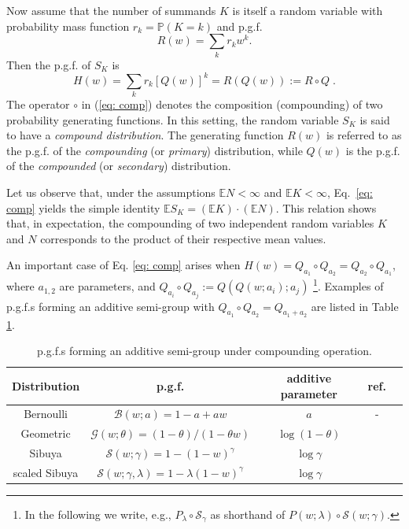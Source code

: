 \documentclass[a4paper,12pt]{amsart}
\newcommand{\E}{\mathbb{E}}
\theoremstyle{definition}
\theoremstyle{remark}
\begin{document}
Now assume that the number of summands \(K\) is itself a random variable with probability mass function \(r_k = \mathbb{P}(K = k)\) and p.g.f.
\[
R(w) = \sum_{k} r_k w^k.
\]
Then the p.g.f. of \(S_K\) is
\begin{equation}
\label{eq: comp}
H(w) = \sum_{k} r_k [Q(w)]^k = R(Q(w)) := R \circ Q \;.
\end{equation}
The operator \(\circ\) in (\ref{eq: comp}) denotes the composition (compounding) of two probability generating functions. In this setting, the random variable \(S_K\) is said to have a {\it compound distribution}. The generating function \(R(w)\) is referred to as the p.g.f. of the {\it compounding} (or {\it primary}) distribution, while \(Q(w)\) is the p.g.f. of the {\it compounded} (or {\it secondary}) distribution.

Let us observe that, under the assumptions $\E N<\infty$ and $\E K<\infty$, Eq.~\ref{eq: comp} yields the simple identity $\E S_K = (\E K)\cdot(\E N)$. This relation shows that, in expectation, the compounding of two independent random variables $K$ and $N$ corresponds to the product of their respective mean values.

An important case of Eq. \ref{eq: comp} arises when $H(w)=Q_{a_1}\circ Q_{a_2}=Q_{a_2}\circ Q_{a_1}$, where $a_{1,2}$ are parameters, and $Q_{a_i}\circ Q_{a_j}:=Q(Q(w;a_i);a_j)$ \footnote{In the following we write, e.g., $P_{\lambda}\circ\mathcal{S}_{\gamma}$ as shorthand of $P(w;\lambda)\circ \mathcal{S}(w;\gamma)$.}.  Examples of p.g.f.{}s forming an additive semi-group with $Q_{a_1}\circ Q_{a_2}= Q_{a_1 +a_2}$ are  listed in Table \ref{tab:additive}.
\begin{table}[hbt]
    \centering
    \begin{tabular}{|c|c|c|c|c|}
    \hline
       {\bf Distribution} & {\bf p.g.f.} & {\bf additive parameter} & {\bf ref.} \\[1.ex]
        \hline  \hline  
        Bernoulli & $\mathcal{B}(w; a)=1-a +a w$ & $a$ &  - \\
        \hline \hline
      Geometric & $\mathcal{G}(w;\theta)=(1-\theta)/(1-\theta w)$ & $\log(1-\theta)$ & \cite{JKK2005}  \\
        \hline \hline
      Sibuya & $\mathcal{S}(w;\gamma)=1-(1- w)^{\gamma}$ & $\log \gamma$ & \cite{art:Sibuya}  \\
         \hline \hline
         scaled Sibuya  & $\mathcal{S}(w;\gamma,\lambda)=1-\lambda(1- w)^{\gamma}$ & $\log \gamma$ & \cite{Christoph2000,Klebanov2023-xj} \\
         \hline
    \end{tabular}
    \vspace{.2cm}\caption{p.g.f.{}s forming an additive semi-group under compounding operation.}
    \label{tab:additive}
\end{table}
\end{document}
